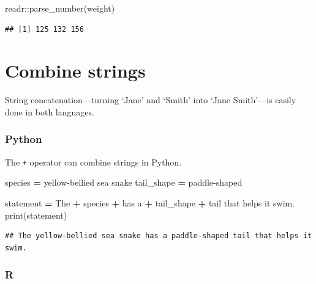 \documentclass[
]{book}
\newenvironment{Shaded}{\begin{snugshade}}{\end{snugshade}}
\newcommand{\BuiltInTok}[1]{#1}
\newcommand{\FunctionTok}[1]{\textcolor[rgb]{0.00,0.00,0.00}{#1}}
\newcommand{\NormalTok}[1]{#1}
\newcommand{\OperatorTok}[1]{\textcolor[rgb]{0.81,0.36,0.00}{\textbf{#1}}}
\newcommand{\SpecialCharTok}[1]{\textcolor[rgb]{0.00,0.00,0.00}{#1}}
\newcommand{\StringTok}[1]{\textcolor[rgb]{0.31,0.60,0.02}{#1}}
\begin{document}
\begin{Shaded}
\begin{Highlighting}[]
\NormalTok{readr}\SpecialCharTok{::}\FunctionTok{parse\_number}\NormalTok{(weight)}
\end{Highlighting}
\end{Shaded}

\begin{verbatim}
## [1] 125 132 156
\end{verbatim}

\hypertarget{combine-strings}{%
\section{Combine strings}\label{combine-strings}}

String concatenation---turning `Jane' and `Smith' into `Jane Smith'---is easily done in both languages.

\hypertarget{python-24}{%
\subsubsection*{Python}\label{python-24}}

The \texttt{+} operator can combine strings in Python.

\begin{Shaded}
\begin{Highlighting}[]
\NormalTok{species }\OperatorTok{=} \StringTok{\textquotesingle{}yellow{-}bellied sea snake\textquotesingle{}}
\NormalTok{tail\_shape }\OperatorTok{=} \StringTok{\textquotesingle{}paddle{-}shaped\textquotesingle{}}

\NormalTok{statement }\OperatorTok{=} \StringTok{\textquotesingle{}The \textquotesingle{}} \OperatorTok{+}\NormalTok{ species }\OperatorTok{+} \StringTok{\textquotesingle{} has a \textquotesingle{}} \OperatorTok{+}\NormalTok{ tail\_shape }\OperatorTok{+} \StringTok{\textquotesingle{} tail that helps it swim.\textquotesingle{}}
\BuiltInTok{print}\NormalTok{(statement)}
\end{Highlighting}
\end{Shaded}

\begin{verbatim}
## The yellow-bellied sea snake has a paddle-shaped tail that helps it swim.
\end{verbatim}

\hypertarget{r-24}{%
\subsubsection*{R}\label{r-24}}
\end{document}
